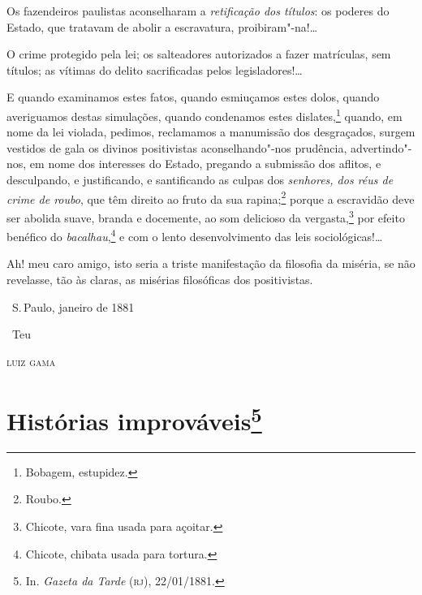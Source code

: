 Os fazendeiros paulistas aconselharam a \emph{retificação dos títulos}:
os poderes do Estado, que tratavam de abolir a escravatura,
proibiram"-na!\ldots{}

O crime protegido pela lei; os salteadores autorizados a fazer
matrículas, sem títulos; as vítimas do delito sacrificadas pelos
legisladores!\ldots{}

E quando examinamos estes fatos, quando esmiuçamos estes dolos, quando
averiguamos destas simulações, quando condenamos estes
dislates,\footnote{Bobagem, estupidez.} quando, em nome da lei
violada, pedimos, reclamamos a manumissão dos desgraçados, surgem
vestidos de gala os divinos positivistas aconselhando"-nos prudência,
advertindo"-nos, em nome dos interesses do Estado, pregando a submissão
dos aflitos, e desculpando, e justificando, e santificando as culpas dos
\emph{senhores, dos réus de crime de roubo}, que têm direito ao fruto da
sua rapina;\footnote{Roubo.} porque a escravidão deve ser abolida
suave, branda e docemente, ao som delicioso da vergasta,\footnote{
  Chicote, vara fina usada para açoitar.} por efeito benéfico do
\emph{bacalhau},\footnote{Chicote, chibata usada para tortura.}
e com o lento
desenvolvimento das leis sociológicas!\ldots{}

Ah! meu caro amigo, isto seria a triste manifestação da filosofia da
miséria, se não revelasse, tão às claras, as misérias filosóficas dos
positivistas.

\bigskip

\hfill\ S.\,Paulo, janeiro de 1881\smallskip

\hfill\ Teu

\hfill\textsc{luiz gama}

\chapter{Histórias improváveis\footnote[*]{In.
  \emph{Gazeta da Tarde} (\textsc{rj}), 22/01/1881.}}

